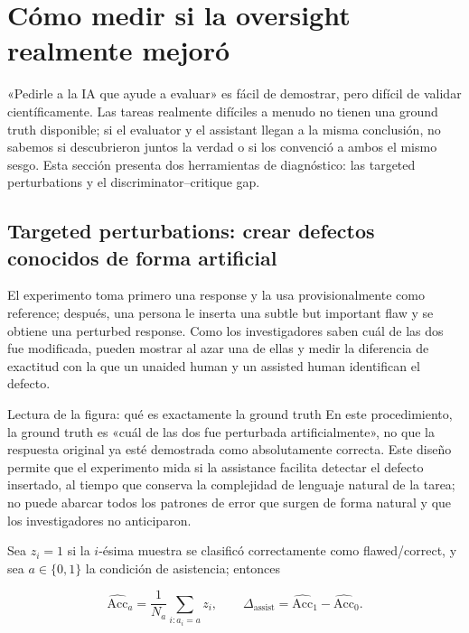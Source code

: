 \section{Cómo medir si la oversight realmente mejoró}

«Pedirle a la IA que ayude a evaluar» es fácil de demostrar, pero difícil de validar científicamente. Las tareas realmente difíciles a menudo no tienen una ground truth disponible; si el evaluator y el assistant llegan a la misma conclusión, no sabemos si descubrieron juntos la verdad o si los convenció a ambos el mismo sesgo. Esta sección presenta dos herramientas de diagnóstico: las targeted perturbations y el discriminator--critique gap.

\subsection{Targeted perturbations: crear defectos conocidos de forma artificial}

El experimento toma primero una response y la usa provisionalmente como reference; después, una persona le inserta una subtle but important flaw y se obtiene una perturbed response. Como los investigadores saben cuál de las dos fue modificada, pueden mostrar al azar una de ellas y medir la diferencia de exactitud con la que un unaided human y un assisted human identifican el defecto.


\begin{knowledgebox}{Lectura de la figura: qué es exactamente la ground truth}
En este procedimiento, la ground truth es «cuál de las dos fue perturbada artificialmente», no que la respuesta original ya esté demostrada como absolutamente correcta. Este diseño permite que el experimento mida si la assistance facilita detectar el defecto insertado, al tiempo que conserva la complejidad de lenguaje natural de la tarea; no puede abarcar todos los patrones de error que surgen de forma natural y que los investigadores no anticiparon.
\end{knowledgebox}

Sea $z_i=1$ si la $i$-ésima muestra se clasificó correctamente como flawed/correct, y sea $a\in\{0,1\}$ la condición de asistencia; entonces

\[
\widehat{\mathrm{Acc}}_a=\frac{1}{N_a}\sum_{i:a_i=a} z_i,
\qquad
\Delta_{\mathrm{assist}}=\widehat{\mathrm{Acc}}_1-\widehat{\mathrm{Acc}}_0.
\]

